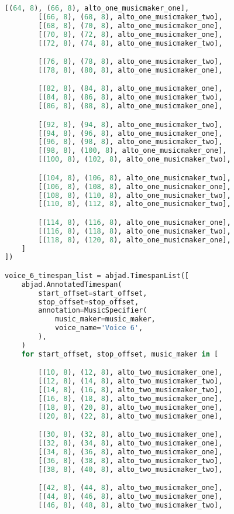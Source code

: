 \begin{lstlisting}[language=Python, caption=Invocation Source Code]
        [(64, 8), (66, 8), alto_one_musicmaker_one],
        [(66, 8), (68, 8), alto_one_musicmaker_two],
        [(68, 8), (70, 8), alto_one_musicmaker_one],
        [(70, 8), (72, 8), alto_one_musicmaker_one],
        [(72, 8), (74, 8), alto_one_musicmaker_two],

        [(76, 8), (78, 8), alto_one_musicmaker_two],
        [(78, 8), (80, 8), alto_one_musicmaker_one],

        [(82, 8), (84, 8), alto_one_musicmaker_one],
        [(84, 8), (86, 8), alto_one_musicmaker_two],
        [(86, 8), (88, 8), alto_one_musicmaker_one],

        [(92, 8), (94, 8), alto_one_musicmaker_two],
        [(94, 8), (96, 8), alto_one_musicmaker_one],
        [(96, 8), (98, 8), alto_one_musicmaker_two],
        [(98, 8), (100, 8), alto_one_musicmaker_one],
        [(100, 8), (102, 8), alto_one_musicmaker_two],

        [(104, 8), (106, 8), alto_one_musicmaker_two],
        [(106, 8), (108, 8), alto_one_musicmaker_one],
        [(108, 8), (110, 8), alto_one_musicmaker_two],
        [(110, 8), (112, 8), alto_one_musicmaker_two],

        [(114, 8), (116, 8), alto_one_musicmaker_one],
        [(116, 8), (118, 8), alto_one_musicmaker_two],
        [(118, 8), (120, 8), alto_one_musicmaker_one],
    ]
])

voice_6_timespan_list = abjad.TimespanList([
    abjad.AnnotatedTimespan(
        start_offset=start_offset,
        stop_offset=stop_offset,
        annotation=MusicSpecifier(
            music_maker=music_maker,
            voice_name='Voice 6',
        ),
    )
    for start_offset, stop_offset, music_maker in [

        [(10, 8), (12, 8), alto_two_musicmaker_one],
        [(12, 8), (14, 8), alto_two_musicmaker_two],
        [(14, 8), (16, 8), alto_two_musicmaker_two],
        [(16, 8), (18, 8), alto_two_musicmaker_one],
        [(18, 8), (20, 8), alto_two_musicmaker_one],
        [(20, 8), (22, 8), alto_two_musicmaker_one],

        [(30, 8), (32, 8), alto_two_musicmaker_one],
        [(32, 8), (34, 8), alto_two_musicmaker_one],
        [(34, 8), (36, 8), alto_two_musicmaker_one],
        [(36, 8), (38, 8), alto_two_musicmaker_two],
        [(38, 8), (40, 8), alto_two_musicmaker_two],

        [(42, 8), (44, 8), alto_two_musicmaker_one],
        [(44, 8), (46, 8), alto_two_musicmaker_one],
        [(46, 8), (48, 8), alto_two_musicmaker_two],


\end{lstlisting}
